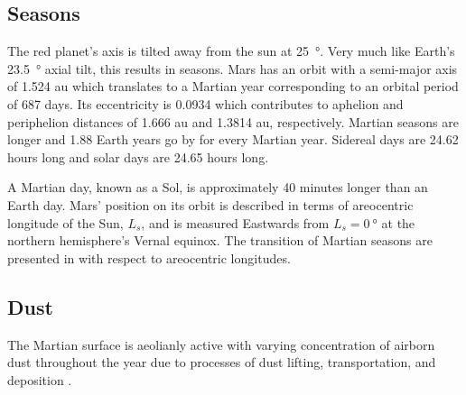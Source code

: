 %

\subsection{Seasons}
\label{sec:MartianEnvironment:Seasons}
The red planet's axis is tilted away from the sun at \SI{25}{\degree}. Very much like Earth's \SI{23.5}{\degree} axial tilt, this results in seasons. Mars has an orbit with a semi-major axis of 1.524 \si{\astronomicalunit} which translates to a Martian year corresponding to an orbital period of 687 days. Its eccentricity is 0.0934 which contributes to aphelion and periphelion distances of 1.666 \si{\astronomicalunit} and 1.3814 \si{\astronomicalunit}, respectively. Martian seasons are longer and 1.88 Earth years go by for every Martian year. Sidereal days are 24.62 hours long and solar days are 24.65 hours long.



A Martian day, known as a Sol, is approximately 40 minutes longer than an Earth day. Mars' position on its orbit is described in terms of areocentric longitude of the Sun, $L_{s}$, and is measured Eastwards from $L_{s} = \SI{0}{\degree}$ at the northern hemisphere's Vernal equinox. The transition of Martian seasons are presented in  with respect to areocentric longitudes.

\clearpage
\subsection{Dust}
\label{sec:MartianEnvironment:Dust}
The Martian surface is aeolianly active with varying concentration of airborn dust throughout the year due to processes of dust lifting, transportation, and deposition .

